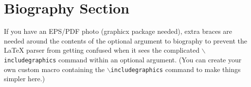 \documentclass[lettersize,journal]{IEEEtran}
\begin{document}














\newpage

\section{Biography Section}
If you have an EPS/PDF photo (graphicx package needed), extra braces are
 needed around the contents of the optional argument to biography to prevent
 the LaTeX parser from getting confused when it sees the complicated
 $\backslash${\tt{includegraphics}} command within an optional argument. (You can create
 your own custom macro containing the $\backslash${\tt{includegraphics}} command to make things
 simpler here.)
 
\vspace{11pt}
\end{document}
